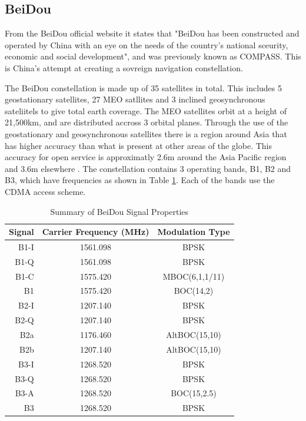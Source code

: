 \subsection{BeiDou} \label{subsec:GNSS_BeiDouIntro}
From the BeiDou official website it states that "BeiDou has been constructed and operated by China with an eye on the needs of the country's national sceurity, economic
and social development", and was previously known as COMPASS. This is China's attempt at creating a sovreign navigation constellation.

The BeiDou constellation is made up of 35 satellites in total. This includes 5 geostationary satellites, 27 MEO satllites and 3 inclined geosynchronous sateliitels to
give total earth coverage. The MEO satellites orbit at a height of 21,500km, and are distributed accross 3 orbital planes. Through the use of the geostationary and
geosynchronous satellites there is a region around Asia that has higher accuracy than what is present at other areas of the globe. This accuracy for open service is
approximatly 2.6m around the Asia Pacific region and 3.6m elsewhere \cite{RN59}. The constellation contains 3 operating bands, B1, B2 and B3, which have frequencies as shown in Table
\ref{tab:Beidou Signal}. Each of the bands use the CDMA access scheme.

\renewcommand{\arraystretch}{1.5}
\begin{table}
    \begin{center}
        \caption{Summary of BeiDou Signal Properties \cite{RN59}}
        \label{tab:Beidou Signal}
        \begin{tabular}{ |r|c|c| }
            \hline
            \textbf{Signal} & \textbf{Carrier Frequency (MHz)} & \textbf{Modulation Type} \\
            \hline
            B1-I & 1561.098 & BPSK\\
            \hline
            B1-Q & 1561.098 & BPSK\\
            \hline
            B1-C & 1575.420 & MBOC(6,1,1/11)\\
            \hline
            B1 & 1575.420 & BOC(14,2)\\
            \hline 
            \hline
            B2-I & 1207.140 & BPSK\\
            \hline
            B2-Q & 1207.140 & BPSK\\
            \hline
            B2a & 1176.460 & AltBOC(15,10)\\
            \hline
            B2b & 1207.140 & AltBOC(15,10)\\
            \hline 
            \hline
            B3-I & 1268.520 & BPSK\\
            \hline
            B3-Q & 1268.520 & BPSK\\
            \hline
            B3-A & 1268.520 & BOC(15,2.5)\\
            \hline
            B3 & 1268.520 & BPSK\\
            \hline
        \end{tabular}
    \end{center}
\end{table}
\renewcommand{\arraystretch}{1}

